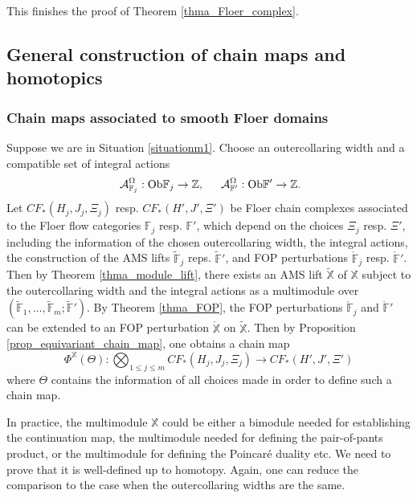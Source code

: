 \documentclass[reqno, 10pt]{amsart}
\numberwithin{equation}{section}
\numberwithin{equation}{section}
\theoremstyle{definition}
\theoremstyle{remark}
\newcommand{\beqn}{\begin{equation*}}
\newcommand{\eeqn}{\end{equation*}}
\newcommand{\mb}{\mathbb}
\newcommand{\mc}{\mathcal}
\begin{document}
This finishes the proof of Theorem \ref{thma_Floer_complex}.

\subsection{General construction of chain maps and homotopics}\label{subsection132}

\subsubsection{Chain maps associated to smooth Floer domains}

Suppose we are in Situation \ref{situationm1}. Choose an outercollaring width and a compatible set of integral actions
\begin{align*}
&\ {\mc A}_{{\mb F}_j}^{\Omega}: {\rm Ob}{\mb F}_j \to {\mb Z},\ &\ {\mc A}_{{\mb F}'}^{\Omega}: {\rm Ob}{\mb F}' \to {\mb Z}.
\end{align*}
Let $CF_*(H_j, J_j, \Xi_j)$ resp. $CF_*(H', J', \Xi')$ be Floer chain complexes associated to the Floer flow categories ${\mb F}_j$ resp. ${\mb F}'$, which depend on the choices $\Xi_j$ resp. $\Xi'$, including the information of the chosen outercollaring width, the integral actions, the construction of the AMS lifts $\tilde {\mb F}_j$ reps. $\tilde{\mb F}'$, and FOP perturbations $\mathring {\mb F}_j$ resp. $\mathring {\mb F}'$. Then by Theorem \ref{thma_module_lift}, there exists an AMS lift $\tilde{\mb X}$ of ${\mb X}$ subject to the outercollaring width and the integral actions as a multimodule over $(\tilde {\mb F}_1, \ldots, \tilde {\mb F}_m; \tilde {\mb F}')$. By Theorem \ref{thma_FOP}, the FOP perturbations $\mathring {\mb F}_j$ and $\mathring {\mb F}'$ can be extended to an FOP perturbation $\mathring {\mb X}$ on $\tilde {\mb X}$. Then by Proposition \ref{prop_equivariant_chain_map}, one obtains a chain map
\beqn
\Phi^{\mb{X}}(\Theta): \bigotimes_{1 \leq j \leq m} CF_*(H_j, J_j, \Xi_j) \to CF_*(H', J', \Xi')
\eeqn
where $\Theta$ contains the information of all choices made in order to define such a chain map.

In practice, the multimodule ${\mb X}$ could be either a bimodule needed for establishing the continuation map, the multimodule needed for defining the pair-of-pants product, or the multimodule for defining the Poincar\'e duality etc. We need to prove that it is well-defined up to homotopy. Again, one can reduce the comparison to the case when the outercollaring widths are the same. 
\end{document}
